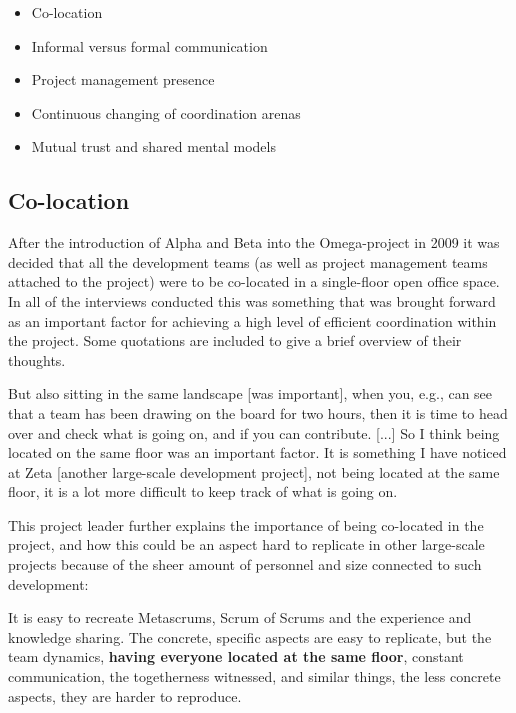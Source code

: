 \begin{itemize}
   \item Co-location
   \item Informal versus formal communication
   \item Project management presence
   \item Continuous changing of coordination arenas
   \item Mutual trust and shared mental models
\end{itemize}

\subsection{Co-location}

After the introduction of Alpha and Beta into the Omega-project in 2009 it was decided that all the development teams (as well as project management teams attached to the project) were to be co-located in a single-floor open office space. In all of the interviews conducted this was something that was brought forward as an important factor for achieving a high level of efficient coordination within the project. Some quotations are included to give a brief overview of their thoughts.

\begin{fancyquotes}
But also sitting in the same landscape [was important], when you, e.g., can see that a team has been drawing on the board for two hours, then it is time to head over and check what is going on, and if you can contribute. [...] So I think being located on the same floor was an important factor. It is something I have noticed at Zeta [another large-scale development project], not being located at the same floor, it is a lot more difficult to keep track of what is going on. 
\end{fancyquotes}

This project leader further explains the importance of being co-located in the project, and how this could be an aspect hard to replicate in other large-scale projects because of the sheer amount of personnel and size connected to such development:

\begin{fancyquotes}
It is easy to recreate Metascrums, Scrum of Scrums and the experience and knowledge sharing. The concrete, specific aspects are easy to replicate, but the team dynamics, \textbf{having everyone located at the same floor}, constant communication, the togetherness witnessed, and similar things, the less concrete aspects, they are harder to reproduce.
\end{fancyquotes}

